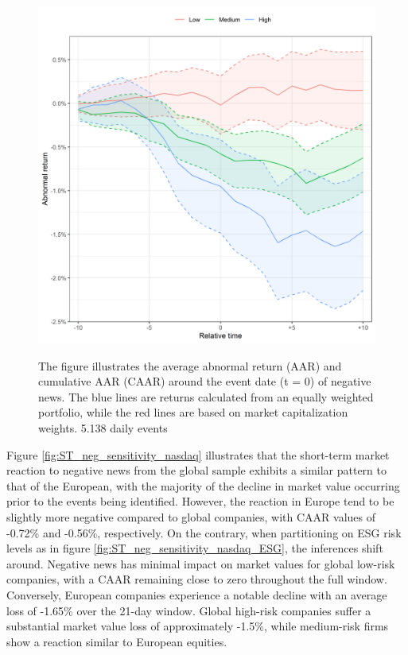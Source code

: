 \begin{figure} [H]
\begin{minipage}[b]{0.49\textwidth}
    \includegraphics[width=\textwidth]{Projekt/1.Figures analysis/ST_negative_ESG_nasdaq.png}
    \label{fig:ST_neg_sensitivity_nasdaq_ESG}
     \end{minipage}
        \caption*{\footnotesize The figure illustrates the average abnormal return (AAR) and cumulative AAR (CAAR) around the event date (t = 0) of negative news. The blue lines are returns calculated from an equally weighted portfolio, while the red lines are based on market capitalization weights. 5.138 daily events }
        
        \label{fig:three graphs}
\end{figure}

Figure \ref{fig:ST_neg_sensitivity_nasdaq} illustrates that the short-term market reaction to negative news from the global sample exhibits a similar pattern to that of the European, with the majority of the decline in market value occurring prior to the events being identified. However, the reaction in Europe tend to be slightly more negative compared to global companies, with CAAR values of -0.72\% and -0.56\%, respectively. On the contrary, when partitioning on ESG risk levels as in figure \ref{fig:ST_neg_sensitivity_nasdaq_ESG}, the inferences shift around. Negative news has minimal impact on market values for global low-risk companies, with a CAAR remaining close to zero throughout the full window. Conversely, European companies experience a notable decline with an average loss of -1.65\% over the 21-day window.  Global high-risk companies suffer a substantial market value loss of approximately -1.5\%, while medium-risk firms show a reaction similar to European equities. 

